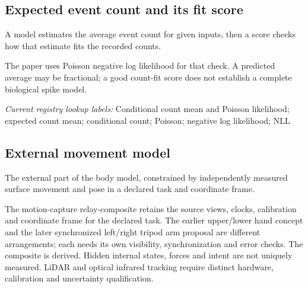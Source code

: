 \begin{samepage}
\subsection*{Expected event count and its fit score}
\noindent A model estimates the average event count for given inputs, then a score checks how that estimate fits the recorded counts.\par
\end{samepage}
\begin{samepage}
\noindent The paper uses Poisson negative log likelihood for that check. A predicted average may be fractional; a good count-fit score does not establish a complete biological spike model.\par\nopagebreak[4]

\end{samepage}


\noindent\textit{Current registry lookup labels:} Conditional count mean and Poisson likelihood; expected count mean; conditional count; Poisson; negative log likelihood; NLL\par

\begin{samepage}
\subsection*{External movement model}
\noindent The external part of the body model, constrained by independently measured surface movement and pose in a declared task and coordinate frame.\par
\end{samepage}
\noindent The motion-capture relay-composite retains the source views, clocks, calibration and coordinate frame for the declared task. The earlier upper/lower hand concept and the later synchronized left/right tripod arm proposal are different arrangements; each needs its own visibility, synchronization and error checks. The composite is derived. Hidden internal states, forces and intent are not uniquely measured. LiDAR and optical infrared tracking require distinct hardware, calibration and uncertainty qualification.\par

